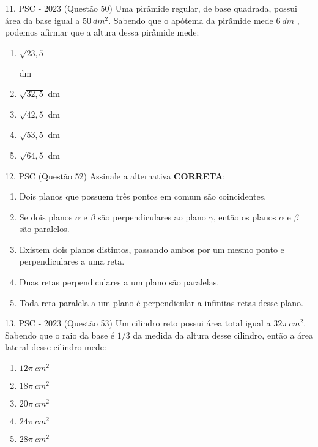 \documentclass[aspectratio=169]{beamer}
\newif\ifusarcorvermelha
\newcommand{\vermelho}[1]{%
    \ifusarcorvermelha
        {\color{red}#1}%
    \else
        #1%
    \fi
}
\begin{document}
    \begin{frame}{11. PSC  - 2023 (Questão 50)}
       Uma pirâmide regular, de base quadrada, possui área da base igual a $50 \ dm^{2}$. Sabendo que o apótema da pirâmide mede $6 \ dm$ , podemos afirmar que a altura dessa pirâmide mede:


         \begin{enumerate}[a]
                    \item \vermelho{$\sqrt{23,5}$} dm %
                    \item $\sqrt{32,5}$ dm
                    \item $\sqrt{42,5}$ dm
                    \item $\sqrt{53,5}$ dm
                    \item $\sqrt{64,5}$ dm
                \end{enumerate}        
    \end{frame}

    \begin{frame}{12. PSC  (Questão 52)}
       Assinale a alternativa \textbf{CORRETA}:


         \begin{enumerate}[a]
                    \item Dois planos que possuem três pontos em comum são coincidentes.
                    \item Se dois planos $\alpha$ e $\beta$ são perpendiculares ao plano $\gamma$, então os planos $\alpha$ e $\beta$ são paralelos.
                    \item Existem dois planos distintos, passando ambos por um mesmo ponto e perpendiculares a uma reta.
                    \item \vermelho{Duas retas perpendiculares a um plano são paralelas.} %
                    \item Toda reta paralela a um plano é perpendicular a infinitas retas desse plano.

                \end{enumerate}        
    \end{frame}

    \begin{frame}{13. PSC  - 2023 (Questão 53)}
      Um cilindro reto possui área total igual a $32\pi \ cm^{2}$. Sabendo que o raio da base é ${1}/{3}$ da medida da altura desse cilindro, então a área lateral desse cilindro mede:
       
         \begin{enumerate}[a]
                    \item $12\pi \ cm^{2}$
                    \item $18\pi \ cm^{2}$
                    \item $20\pi \ cm^{2}$
                    \item \vermelho{$24\pi \ cm^{2}$} %
                    \item $28\pi \ cm^{2}$

                \end{enumerate}        
    \end{frame}
\end{document}
